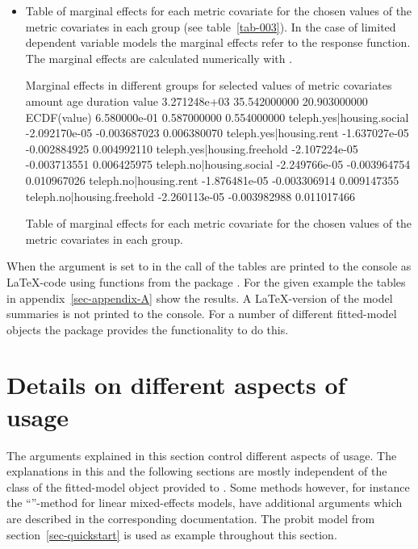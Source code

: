 \documentclass[nojss]{jss}
\newcommand{\class}[1]{``\code{#1}''}
\begin{document}
\begin{itemize} [leftmargin=1cm, label=$\bullet$]
\item Table of marginal effects for each metric covariate for the chosen values of the metric covariates 
in each group (see table~\ref{tab-003}). In the case of limited dependent variable models the marginal effects refer to the response function.  The marginal effects are calculated numerically with .

\begin{table}[ht]
\centering
\begin{minipage}[c]{14cm}
\begin{CodeChunk}
\small
\begin{CodeOutput}
Marginal effects in different groups for selected values of metric covariates
                                   amount          age     duration
value                        3.271248e+03 35.542000000 20.903000000
ECDF(value)                  6.580000e-01  0.587000000  0.554000000
teleph.yes|housing.social   -2.092170e-05 -0.003687023  0.006380070
teleph.yes|housing.rent     -1.637027e-05 -0.002884925  0.004992110
teleph.yes|housing.freehold -2.107224e-05 -0.003713551  0.006425975
teleph.no|housing.social    -2.249766e-05 -0.003964754  0.010967026
teleph.no|housing.rent      -1.876481e-05 -0.003306914  0.009147355
teleph.no|housing.freehold  -2.260113e-05 -0.003982988  0.011017466
\end{CodeOutput}
\end{CodeChunk}
\end{minipage}
\caption{Table of marginal effects for each metric covariate for the chosen values of the metric covariates in each group.} \label{tab-003}
\end{table}
\end{itemize}

When the argument  is set to  in the call of  the tables are printed to the console as \LaTeX-code using functions from the package . For the given example the tables in appendix~\ref{sec-appendix-A} show the results.
 A \LaTeX-version of the model summaries is not printed to the console.  For a number of different fitted-model objects the package  \citep{Leif2013} provides the functionality to do this.

\section{Details on different aspects of usage} \label{sec-usage}
The arguments explained in this section control different aspects of usage. The explanations in this and the following sections are mostly independent of the class of the fitted-model object provided to . Some methods however, for instance the \class{lme}-method for linear mixed-effects models, have additional arguments which are described in the corresponding documentation. The probit model from section~\ref{sec-quickstart} is used as example throughout this section.   
\end{document}
